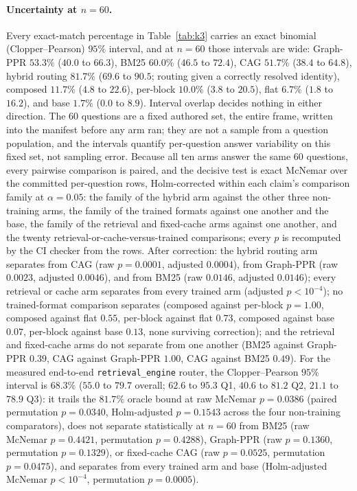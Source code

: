 \documentclass{article}
\begin{document}
\paragraph{Uncertainty at $n{=}60$.}
Every exact-match percentage in Table~\ref{tab:k3} carries an exact binomial (Clopper--Pearson) $95\%$ interval, and at $n{=}60$ those intervals are wide: Graph-PPR $53.3\%$ ($40.0$ to $66.3$), BM25 $60.0\%$ ($46.5$ to $72.4$), CAG $51.7\%$ ($38.4$ to $64.8$), hybrid routing $81.7\%$ ($69.6$ to $90.5$; routing given a correctly resolved identity), composed $11.7\%$ ($4.8$ to $22.6$), per-block $10.0\%$ ($3.8$ to $20.5$), flat $6.7\%$ ($1.8$ to $16.2$), and base $1.7\%$ ($0.0$ to $8.9$). Interval overlap decides nothing in either direction. The 60 questions are a fixed authored set, the entire frame, written into the manifest before any arm ran; they are not a sample from a question population, and the intervals quantify per-question answer variability on this fixed set, not sampling error. Because all ten arms answer the same 60 questions, every pairwise comparison is paired, and the decisive test is exact McNemar over the committed per-question rows, Holm-corrected within each claim's comparison family at $\alpha{=}0.05$: the family of the hybrid arm against the other three non-training arms, the family of the trained formats against one another and the base, the family of the retrieval and fixed-cache arms against one another, and the twenty retrieval-or-cache-versus-trained comparisons; every $p$ is recomputed by the CI checker from the rows. After correction: the hybrid routing arm separates from CAG (raw $p{=}0.0001$, adjusted $0.0004$), from Graph-PPR (raw $0.0023$, adjusted $0.0046$), and from BM25 (raw $0.0146$, adjusted $0.0146$); every retrieval or cache arm separates from every trained arm (adjusted $p < 10^{-4}$); no trained-format comparison separates (composed against per-block $p{=}1.00$, composed against flat $0.55$, per-block against flat $0.73$, composed against base $0.07$, per-block against base $0.13$, none surviving correction); and the retrieval and fixed-cache arms do not separate from one another (BM25 against Graph-PPR $0.39$, CAG against Graph-PPR $1.00$, CAG against BM25 $0.49$). For the measured end-to-end \texttt{retrieval\_engine} router, the Clopper--Pearson $95\%$ interval is $68.3\%$ ($55.0$ to $79.7$ overall; $62.6$ to $95.3$ Q1, $40.6$ to $81.2$ Q2, $21.1$ to $78.9$ Q3): it trails the $81.7\%$ oracle bound at raw McNemar $p{=}0.0386$ (paired permutation $p{=}0.0340$, Holm-adjusted $p{=}0.1543$ across the four non-training comparators), does not separate statistically at $n{=}60$ from BM25 (raw McNemar $p{=}0.4421$, permutation $p{=}0.4288$), Graph-PPR (raw $p{=}0.1360$, permutation $p{=}0.1329$), or fixed-cache CAG (raw $p{=}0.0525$, permutation $p{=}0.0475$), and separates from every trained arm and base (Holm-adjusted McNemar $p < 10^{-4}$, permutation $p{=}0.0005$).
\end{document}
